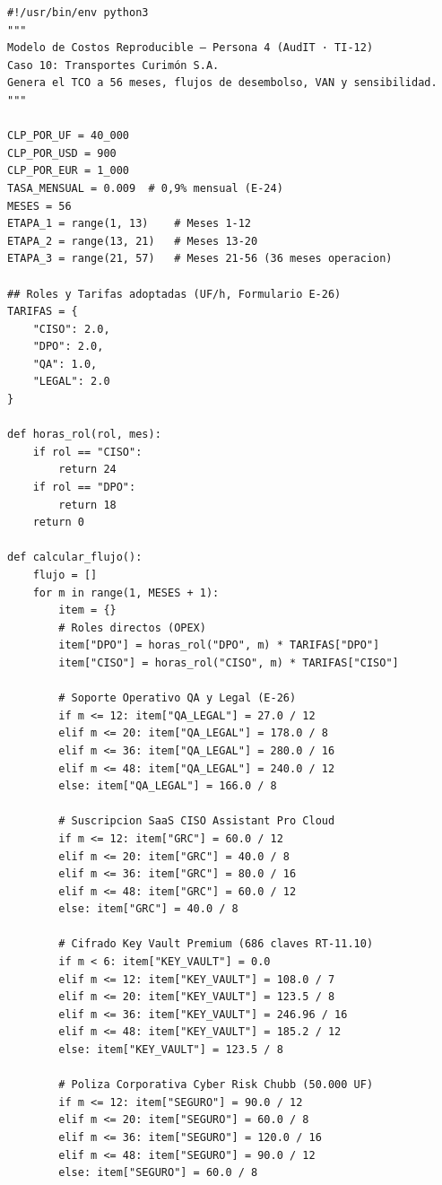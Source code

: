 \begin{verbatim}
#!/usr/bin/env python3
"""
Modelo de Costos Reproducible — Persona 4 (AudIT · TI-12)
Caso 10: Transportes Curimón S.A.
Genera el TCO a 56 meses, flujos de desembolso, VAN y sensibilidad.
"""

CLP_POR_UF = 40_000
CLP_POR_USD = 900
CLP_POR_EUR = 1_000
TASA_MENSUAL = 0.009  # 0,9% mensual (E-24)
MESES = 56
ETAPA_1 = range(1, 13)    # Meses 1-12
ETAPA_2 = range(13, 21)   # Meses 13-20
ETAPA_3 = range(21, 57)   # Meses 21-56 (36 meses operacion)

## Roles y Tarifas adoptadas (UF/h, Formulario E-26)
TARIFAS = {
    "CISO": 2.0,
    "DPO": 2.0,
    "QA": 1.0,
    "LEGAL": 2.0
}

def horas_rol(rol, mes):
    if rol == "CISO":
        return 24
    if rol == "DPO":
        return 18
    return 0

def calcular_flujo():
    flujo = []
    for m in range(1, MESES + 1):
        item = {}
        # Roles directos (OPEX)
        item["DPO"] = horas_rol("DPO", m) * TARIFAS["DPO"]
        item["CISO"] = horas_rol("CISO", m) * TARIFAS["CISO"]
        
        # Soporte Operativo QA y Legal (E-26)
        if m <= 12: item["QA_LEGAL"] = 27.0 / 12
        elif m <= 20: item["QA_LEGAL"] = 178.0 / 8
        elif m <= 36: item["QA_LEGAL"] = 280.0 / 16
        elif m <= 48: item["QA_LEGAL"] = 240.0 / 12
        else: item["QA_LEGAL"] = 166.0 / 8
        
        # Suscripcion SaaS CISO Assistant Pro Cloud
        if m <= 12: item["GRC"] = 60.0 / 12
        elif m <= 20: item["GRC"] = 40.0 / 8
        elif m <= 36: item["GRC"] = 80.0 / 16
        elif m <= 48: item["GRC"] = 60.0 / 12
        else: item["GRC"] = 40.0 / 8
        
        # Cifrado Key Vault Premium (686 claves RT-11.10)
        if m < 6: item["KEY_VAULT"] = 0.0
        elif m <= 12: item["KEY_VAULT"] = 108.0 / 7
        elif m <= 20: item["KEY_VAULT"] = 123.5 / 8
        elif m <= 36: item["KEY_VAULT"] = 246.96 / 16
        elif m <= 48: item["KEY_VAULT"] = 185.2 / 12
        else: item["KEY_VAULT"] = 123.5 / 8
        
        # Poliza Corporativa Cyber Risk Chubb (50.000 UF)
        if m <= 12: item["SEGURO"] = 90.0 / 12
        elif m <= 20: item["SEGURO"] = 60.0 / 8
        elif m <= 36: item["SEGURO"] = 120.0 / 16
        elif m <= 48: item["SEGURO"] = 90.0 / 12
        else: item["SEGURO"] = 60.0 / 8
        

\end{verbatim}
